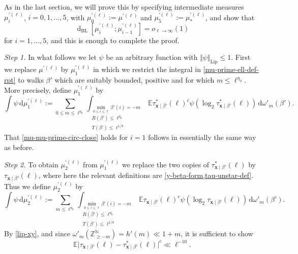 \documentclass[11pt,reqno]{amsart}
\numberwithin{equation}{section}
\theoremstyle{definition}
\theoremstyle{remark}
\newcommand{\mb}{\mathbb}
\newcommand{\mbf}{\mathbf}
\newcommand{\dist}[2]{{\operatorname{d}_{\operatorname{BL}}[#1;#2]}}
\renewcommand{\le}{\leqslant}
\renewcommand{\ge}{\geqslant}
\newcommand\Z{\mathbb{Z}}
\newcommand\N{\mathbb{N}}
\newcommand\Lip{\operatorname{Lip}}
\begin{document}
As in the last section, we will prove this by specifying intermediate measures $\mu_i^{\prime (\ell)}$, $i = 0,1,\dots, 5$, with $\mu_0^{\prime (\ell)} := \mu^{\prime (\ell)}$ and $\mu_5^{\prime (\ell)} := \mu_{*}^{\prime (\ell)}$, and show that 
\begin{equation}\label{mu-mu-prime-circ-close} \dist{\mu^{\prime (\ell)}_{i}}{\mu^{\prime (\ell)}_{i -1}} = o_{\ell \rightarrow \infty}(1)\end{equation} for $i = 1,\dots, 5$, and this is enough to complete the proof.\vspace*{10pt}

\emph{Step 1.} In what follows we let $\psi$ be an arbitrary function with $\Vert \psi \Vert_{\Lip} \le 1$. First we replace $\mu^{\prime (\ell)}$ by $\mu_1^{\prime (\ell)}$ in which we restrict the integral in \cref{mu-prime-ell-def-rpt} to walks $\beta'$ which are suitably bounded, positive and for which $m \le \ell^{\eta_0}$. More precisely, define $\mu_1^{\prime (\ell)}$ by
\[ \int \psi \, \mathrm{d} \mu_1^{\prime (\ell)} := \sum_{0 \le m \le \ell^{\eta_0}}\int_{\substack{\min_{0 \le i \le \ell} \beta'(i) = -m \\ R(\beta') \le \ell^{\eta_0} \\ T(\beta') \le \ell^{1/8}}} \mb{E} \tau^*_{\mbf{x} \mid \beta'}(\ell)^c \psi (\log_2 \tau^*_{\mbf{x} \mid \beta'}(\ell)) \, \mathrm{d}\omega'_m(\beta').\]
That \cref{mu-mu-prime-circ-close} holds for $i = 1$ follows in essentially the same way as before.\vspace*{10pt}


\emph{Step 2.} To obtain $\mu_2^{\prime (\ell)}$ from $\mu_1^{\prime (\ell)}$ we replace the two copies of $\tau^*_{\mbf{x} \mid \beta'}(\ell)$ by $\tau_{\mbf{x} \mid \beta'}(\ell)$, where here the relevant definitions are \cref{y-beta-form,tau-unstar-def}. Thus we define $\mu_2^{\prime (\ell)}$ by
\begin{equation} \int \psi \, \mathrm{d} \mu_2^{\prime (\ell)} := \sum_{m \le \ell^{\eta_0}}\int_{\substack{\min_{0 \le i \le \ell} \beta'(i) = -m \\ R(\beta') \le \ell^{\eta_0} \\ T(\beta') \le \ell^{1/8}}} \mb{E} \tau_{\mbf{x} \mid \beta'}(\ell)^c \psi (\log_2 \tau_{\mbf{x} \mid \beta'}(\ell)) \, \mathrm{d}\omega'_m(\beta').\end{equation}
 By \cref{lip-xy}, and since $\omega'_m(\Z^{\N}_{\ge -m}) = h'(m) \ll 1 + m$, it is sufficient to show
\begin{equation}\label{suff-step2-y} \mb{E}\big|  \tau_{\mbf{x}\mid \beta'}(\ell) - \tau^*_{\mbf{x} \mid \beta'}(\ell) \big|^c \ll \ell^{-10}.\end{equation} 
\end{document}
